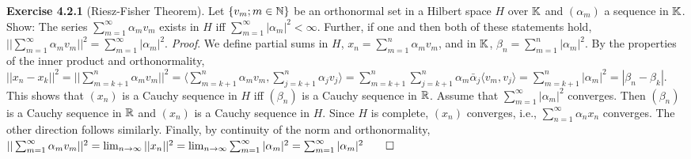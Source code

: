 {\bf Exercise 4.2.1} (Riesz-Fisher Theorem). Let $\{v_m;m\in \mathbb{N}\}$ be an orthonormal set in a Hilbert space $H$ over $\mathbb{K}$ and $(\alpha_m)$ a sequence in $\mathbb{K}$. Show: The series $\sum_{m=1}^{\infty} \alpha_m v_m$ exists in $H$ iff $\sum_{m=1}^{\infty} |\alpha_m|^2 < \infty$. Further, if one and then both of these statements hold, $||\sum_{m=1}^{\infty} \alpha_m v_m||^2=\sum_{m=1}^{\infty}|\alpha_m|^2$. {\it Proof}. We define partial sums in $H$, $x_n=\sum_{m=1}^n \alpha_m v_m$, and in $\mathbb{K}$, $\beta_n = \sum_{m=1}^n |\alpha_m|^2$.  By the properties of the inner product and orthonormality, $||x_n - x_k||^2 = ||\sum_{m=k+1}^n \alpha_m v_m||^2=\langle\sum_{m=k+1}^n \alpha_m v_m, \sum_{j=k+1}^n \alpha_j v_j \rangle = \sum_{m=k+1}^n \sum_{j=k+1}^n \alpha_m \bar{\alpha}_j \langle  v_m,  v_j \rangle =\sum_{m=k+1}^n|\alpha_m|^2 = |\beta_n-\beta_k|$. This shows that $(x_n)$ is a Cauchy sequence in $H$ iff $(\beta_n)$ is a Cauchy sequence in $\mathbb{R}$. Assume that $\sum_{m=1}^{\infty}|\alpha_m|^2$ converges.  Then $(\beta_n)$ is a Cauchy sequence in $\mathbb{R}$ and $(x_n)$ is a Cauchy sequence in $H$.  Since $H$ is complete, $(x_n)$ converges, i.e., $\sum_{n=1}^{\infty} \alpha_n x_n$ converges. The other direction follows similarly.  Finally, by continuity of the norm and orthonormality, $||\sum_{m=1}^{\infty} \alpha_m v_m||^2=\lim_{n\rightarrow \infty}||x_n||^2=\lim_{n\rightarrow \infty}\sum_{m=1}^{\infty}|\alpha_m|^2=\sum_{m=1}^{\infty}|\alpha_m|^2 \qed$